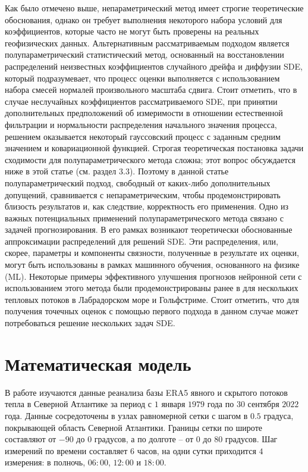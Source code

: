 Как было отмечено выше, непараметрический метод имеет строгие теоретические обоснования, однако он требует выполнения некоторого набора условий для коэффициентов, которые часто не могут быть проверены на реальных геофизических данных. Альтернативным рассматриваемым подходом является полупараметрический статистический метод, основанный на восстановлении распределений неизвестных коэффициентов случайного дрейфа и диффузии SDE, который подразумевает, что процесс оценки выполняется с использованием набора смесей нормалей произвольного масштаба сдвига. Стоит отметить, что в случае неслучайных коэффициентов рассматриваемого SDE, при принятии дополнительных предположений об измеримости в отношении естественной фильтрации и нормальности распределения начального значения процесса, решением оказывается некоторый гауссовский процесс с заданным средним значением и ковариационной функцией. Строгая теоретическая постановка задачи сходимости для полупараметрического метода сложна; этот вопрос обсуждается ниже в этой статье (см. раздел 3.3). Поэтому в данной статье полупараметрический подход, свободный от каких-либо дополнительных допущений, сравнивается с непараметрическим, чтобы продемонстрировать близость результатов и, как следствие, корректность его применения. Одно из важных потенциальных применений полупараметрического метода связано с задачей прогнозирования. В его рамках возникают теоретически обоснованные аппроксимации распределений для решений SDE. Эти распределения, или, скорее, параметры и компоненты связности, полученные в результате их оценки, могут быть использованы в рамках машинного обучения, основанного на физике (ML). Некоторые примеры эффективного улучшения прогнозов нейронной сети с использованием этого метода были продемонстрированы ранее в \cite{Kuzmin2022} для нескольких тепловых потоков в Лабрадорском море и Гольфстриме. Стоит отметить, что для получения точечных оценок с помощью первого подхода в данном случае может потребоваться решение нескольких задач SDE.

\section{Математическая модель}
\label{SecModel}
В работе изучаются данные реанализа базы ERA5 явного и скрытого потоков тепла в Северной Атлантике за период с $1$ января $1979$ года по $30$ сентября $2022$ года.
Данные сосредоточены в узлах равномерной сетки с шагом в $0.5$ градуса, покрывающей область Северной Атлантики. Границы сетки по широте составляют от $-90$ до $0$ градусов, а по долготе -- от $0$ до $80$ градусов. Шаг измерений по времени составляет $6$ часов, на одни сутки приходится $4$ измерения: в полночь, $06:00$, $12:00$ и $18:00$.

